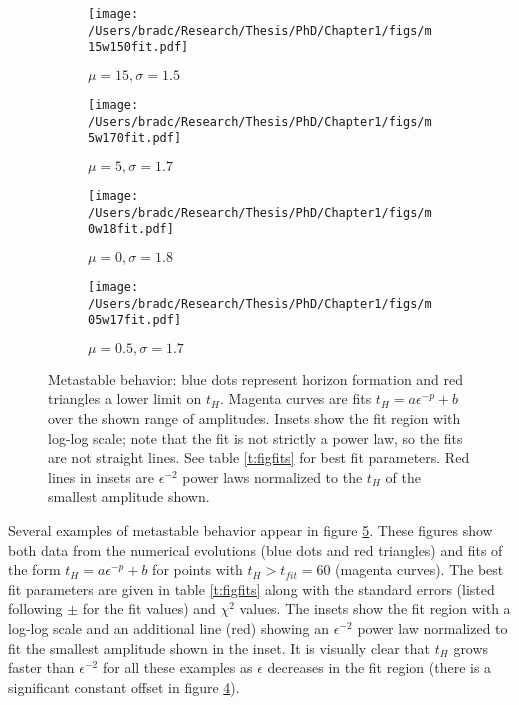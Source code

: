 \documentclass[../PhD.tex]{subfiles}
\begin{document}
\begin{figure}[!t]
\centering
\begin{subfigure}[t]{0.47\textwidth}
\texttt{[image: /Users/bradc/Research/Thesis/PhD/Chapter1/figs/m15w150fit.pdf]}
\caption{$\mu=15,\sigma=1.5$}
\label{f:m15w150}
\end{subfigure}\hfill
\begin{subfigure}[t]{0.47\textwidth}
\texttt{[image: /Users/bradc/Research/Thesis/PhD/Chapter1/figs/m5w170fit.pdf]}
\caption{$\mu=5,\sigma=1.7$}
\label{f:m5w170}
\end{subfigure}
\begin{subfigure}[t]{0.47\textwidth}
\texttt{[image: /Users/bradc/Research/Thesis/PhD/Chapter1/figs/m0w18fit.pdf]}
\caption{$\mu=0,\sigma=1.8$}
\label{f:m0w18}
\end{subfigure}\hfill
\begin{subfigure}[t]{0.47\textwidth}
\texttt{[image: /Users/bradc/Research/Thesis/PhD/Chapter1/figs/m05w17fit.pdf]}
\caption{$\mu=0.5,\sigma=1.7$}
\label{f:m05w17}
\end{subfigure}
\caption[Horizon formation times for metastable initial data]{Metastable behavior: blue dots represent horizon formation and
red triangles a lower limit on $t_H$.  Magenta curves are fits
$t_H=a\epsilon^{-p}+b$ over the shown range of amplitudes. Insets show the
fit region with log-log scale; note that the fit is not strictly a power
law, so the fits are not straight lines. See table \ref{t:figfits} for best 
fit parameters. Red lines in insets are $\epsilon^{-2}$ power laws normalized
to the $t_H$ of the smallest amplitude shown.}
\label{f:metastable}
\end{figure}

Several examples of metastable behavior appear in figure \ref{f:metastable}.
These figures show both data from the numerical evolutions (blue dots and
red triangles) and fits of the form $t_H=a\epsilon^{-p}+b$ for points with
$t_H>t_{fit}=60$ (magenta curves).  The best fit parameters are given in
table \ref{t:figfits} along with the standard errors (listed following
$\pm$ for the fit values) and $\chi^2$ values. The insets show the fit 
region with a log-log scale and an additional line (red) showing an 
$\epsilon^{-2}$ power law normalized to fit the smallest amplitude shown in
the inset. It is visually clear that $t_H$ grows faster than $\epsilon^{-2}$
for all these examples as $\epsilon$ decreases in the fit region (there is
a significant constant offset in figure \ref{f:m05w17}).
\end{document}
